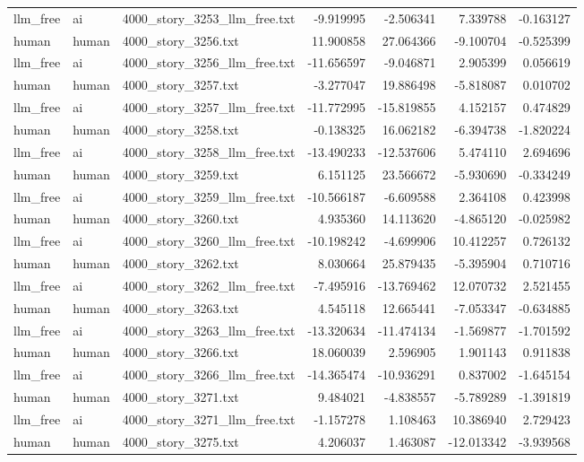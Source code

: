 \begin{longtable}{lllrrrr}
llm\_free & ai & 4000\_story\_3253\_llm\_free.txt & -9.919995 & -2.506341 & 7.339788 & -0.163127 \\
human & human & 4000\_story\_3256.txt & 11.900858 & 27.064366 & -9.100704 & -0.525399 \\
llm\_free & ai & 4000\_story\_3256\_llm\_free.txt & -11.656597 & -9.046871 & 2.905399 & 0.056619 \\
human & human & 4000\_story\_3257.txt & -3.277047 & 19.886498 & -5.818087 & 0.010702 \\
llm\_free & ai & 4000\_story\_3257\_llm\_free.txt & -11.772995 & -15.819855 & 4.152157 & 0.474829 \\
human & human & 4000\_story\_3258.txt & -0.138325 & 16.062182 & -6.394738 & -1.820224 \\
llm\_free & ai & 4000\_story\_3258\_llm\_free.txt & -13.490233 & -12.537606 & 5.474110 & 2.694696 \\
human & human & 4000\_story\_3259.txt & 6.151125 & 23.566672 & -5.930690 & -0.334249 \\
llm\_free & ai & 4000\_story\_3259\_llm\_free.txt & -10.566187 & -6.609588 & 2.364108 & 0.423998 \\
human & human & 4000\_story\_3260.txt & 4.935360 & 14.113620 & -4.865120 & -0.025982 \\
llm\_free & ai & 4000\_story\_3260\_llm\_free.txt & -10.198242 & -4.699906 & 10.412257 & 0.726132 \\
human & human & 4000\_story\_3262.txt & 8.030664 & 25.879435 & -5.395904 & 0.710716 \\
llm\_free & ai & 4000\_story\_3262\_llm\_free.txt & -7.495916 & -13.769462 & 12.070732 & 2.521455 \\
human & human & 4000\_story\_3263.txt & 4.545118 & 12.665441 & -7.053347 & -0.634885 \\
llm\_free & ai & 4000\_story\_3263\_llm\_free.txt & -13.320634 & -11.474134 & -1.569877 & -1.701592 \\
human & human & 4000\_story\_3266.txt & 18.060039 & 2.596905 & 1.901143 & 0.911838 \\
llm\_free & ai & 4000\_story\_3266\_llm\_free.txt & -14.365474 & -10.936291 & 0.837002 & -1.645154 \\
human & human & 4000\_story\_3271.txt & 9.484021 & -4.838557 & -5.789289 & -1.391819 \\
llm\_free & ai & 4000\_story\_3271\_llm\_free.txt & -1.157278 & 1.108463 & 10.386940 & 2.729423 \\
human & human & 4000\_story\_3275.txt & 4.206037 & 1.463087 & -12.013342 & -3.939568 \\

\end{longtable}

